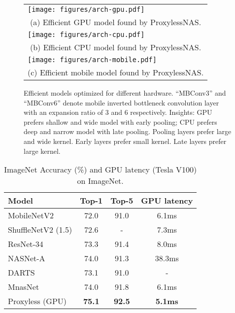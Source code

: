 \documentclass{article} \usepackage{iclr2019_conference,times}
\begin{document}
\begin{figure}[t]
\centering
    \begin{tabular}{l}
        \begin{minipage}{0.726\linewidth}
            \texttt{[image: figures/arch-gpu.pdf]}
        \end{minipage}
        \\
        \multicolumn{1}{c}{ (a) Efficient GPU model found by ProxylessNAS.}
        \vspace{5pt}
        \\
        \begin{minipage}{0.999\linewidth}
            \texttt{[image: figures/arch-cpu.pdf]}
        \end{minipage}
        \\
        \multicolumn{1}{c}{ (b) Efficient CPU model found by ProxylessNAS.}
        \vspace{5pt}
        \\ 
       \begin{minipage}{1\linewidth}
        \texttt{[image: figures/arch-mobile.pdf]}
        \end{minipage}
        \\
        \multicolumn{1}{c}{ (c) Efficient mobile model found by ProxylessNAS.}
    \end{tabular}
\caption{Efficient models optimized for different hardware. ``MBConv3'' and ``MBConv6'' denote mobile inverted bottleneck convolution layer with an expansion ratio of 3 and 6 respectively. Insights: GPU prefers shallow and wide model with early pooling; CPU prefers deep and narrow model with late pooling. Pooling layers prefer large and wide kernel. Early layers prefer small kernel. Late layers prefer large kernel.}
    \label{fig:model_architectures}
\end{figure}

\begin{table}[t]
\centering
\begin{tabular}{l | c | c | c }
        	\hline
        	Model & Top-1 & Top-5 & GPU latency \\
        	\hline
        	MobileNetV2 \citep{sandler2018mobilenetv2} & 72.0 & 91.0 & 6.1ms \\
        	ShuffleNetV2 (1.5) \citep{ma2018shufflenet} & 72.6 & - & 7.3ms \\
        	ResNet-34 \citep{he2016deep} & 73.3 & 91.4 & 8.0ms \\
\hline
        	NASNet-A \citep{zoph2017learning} & 74.0 & 91.3 & 38.3ms \\
        	DARTS \citep{liu2018darts} & 73.1 & 91.0 & - \\
        	MnasNet \citep{tan2018mnasnet} & 74.0 & 91.8 & 6.1ms \\
        	\hline 
        	Proxyless (GPU) & \textbf{75.1} & \textbf{92.5} & \textbf{5.1ms}  \\
        	\hline
        \end{tabular}
\caption{ImageNet Accuracy (\%) and GPU latency (Tesla V100) on ImageNet.}\label{tab:imagenet_gpu}
\end{table}
\end{document}
